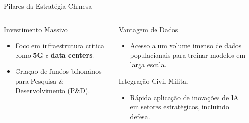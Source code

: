 \documentclass{beamer}
\begin{document}
\begin{frame}{Pilares da Estratégia Chinesa}
    \begin{columns}[T]
        \begin{column}{0.5\textwidth}
            \begin{block}{Investimento Massivo}
                \begin{itemize}
                    \item Foco em infraestrutura crítica como \textbf{5G} e \textbf{data centers}.
                    \item Criação de fundos bilionários para Pesquisa \& Desenvolvimento (P\&D).
                \end{itemize}
            \end{block}
        \end{column}
        
        \begin{column}{0.5\textwidth}
            \begin{block}{Vantagem de Dados}
                \begin{itemize}
                    \item Acesso a um volume imenso de dados populacionais para treinar modelos em larga escala.
                \end{itemize}
            \end{block}
            
            \begin{block}{Integração Civil-Militar}
                \begin{itemize}
                    \item Rápida aplicação de inovações de IA em setores estratégicos, incluindo defesa.
                \end{itemize}
            \end{block}
        \end{column}
    \end{columns}
\end{frame}
\end{document}
